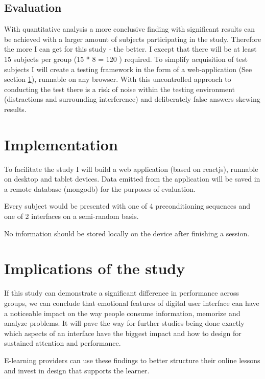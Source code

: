 \subsection{Evaluation}

With quantitative analysis a more conclusive finding with significant results can be achieved with a larger amount of subjects participating in the study. 
Therefore the more I can get for this study - the better. 
I except that there will be at least 15 subjects per group (15 * 8 = 120 ) required.
To simplify acquisition of test subjects I will create a testing framework in the form of a web-application (See section \ref{implementation}), runnable on any browser.
With this uncontrolled approach to conducting the test there is a risk of noise within the testing environment (distractions and surrounding interference) and deliberately false answers skewing results.

\section{Implementation} \label{implementation}

To facilitate the study I will build a web application (based on reactjs), runnable on desktop and tablet devices. Data emitted from the application will be saved in a remote database (mongodb) for the purposes of evaluation.

Every subject would be presented with one of 4 preconditioning sequences and one of 2 interfaces on a semi-random basis.

No information should be stored locally on the device after finishing a session.

\section{Implications of the study}

If this study can demonstrate a significant difference in performance across groups, we can conclude that emotional features of digital user interface can have a noticeable impact on the way people consume information, memorize and analyze problems.
It will pave the way for further studies being done exactly which aspects of an interface have the biggest impact and how to design for sustained attention and performance.

E-learning providers can use these findings to better structure their online lessons and invest in design that supports the learner.

